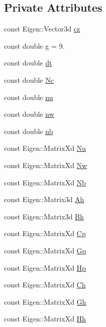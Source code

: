\subsection*{Private Attributes}
\begin{DoxyCompactItemize}
\item 
const Eigen\+::\+Vector3d \hyperlink{classZmpPreviewController_a893b789fddc949d0703461963280f504}{cz}
\item 
const double \hyperlink{classZmpPreviewController_a344571f012aa58250d7625905681bf1b}{g} = 9.
\item 
const double \hyperlink{classZmpPreviewController_abf1a3ec8d1698afab1c20bba32b5a724}{dt}
\item 
const double \hyperlink{classZmpPreviewController_a43e471820b285c89e9d1878448a6f364}{Nc}
\item 
const double \hyperlink{classZmpPreviewController_ac611f084023404faba1ccfab573cd81d}{nu}
\item 
const double \hyperlink{classZmpPreviewController_a783427b817d77469e1f80426bede5310}{nw}
\item 
const double \hyperlink{classZmpPreviewController_a6716ee4c94e6f91e608ee1e29fbc7051}{nb}
\item 
const Eigen\+::\+Matrix\+Xd \hyperlink{classZmpPreviewController_ac3e92145988993ede7ce2060b997c8db}{Nu}
\item 
const Eigen\+::\+Matrix\+Xd \hyperlink{classZmpPreviewController_a5e85354a1a7c3f2a8e265dbe7367051c}{Nw}
\item 
const Eigen\+::\+Matrix\+Xd \hyperlink{classZmpPreviewController_abd345d397e99ae01ad4ea80cd9894802}{Nb}
\item 
const Eigen\+::\+Matrix3d \hyperlink{classZmpPreviewController_a777600c57020a9851912374cfc12ad5a}{Ah}
\item 
const Eigen\+::\+Matrix3d \hyperlink{classZmpPreviewController_a84edf4d475c32ec836732c24eba30ce9}{Bh}
\item 
const Eigen\+::\+Matrix\+Xd \hyperlink{classZmpPreviewController_a1a63870dcc3d51a26c4adc9c97e650ff}{Cp}
\item 
const Eigen\+::\+Matrix\+Xd \hyperlink{classZmpPreviewController_a53a7d8af5be4a5d5cea99fad2ea48979}{Gp}
\item 
const Eigen\+::\+Matrix\+Xd \hyperlink{classZmpPreviewController_a32ab17a3be30490e4a1e874bf3581843}{Hp}
\item 
const Eigen\+::\+Matrix\+Xd \hyperlink{classZmpPreviewController_a2093754713ffb2a7adcd1310c73bf775}{Ch}
\item 
const Eigen\+::\+Matrix\+Xd \hyperlink{classZmpPreviewController_a9429cb06fdd2c3ca5036a2fd48303632}{Gh}
\item 
const Eigen\+::\+Matrix\+Xd \hyperlink{classZmpPreviewController_a8caaf8bf8f06e5b0b53d2cd5c131eefd}{Hh}
\end{DoxyCompactItemize}



